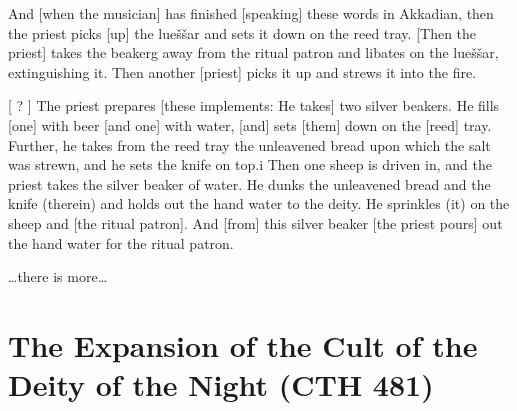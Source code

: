 \documentclass[10pt]{article}
\newcommand{\pr}{\'{ }}									%
\renewcommand{\.}[1]{\textsubdot{#1}}
\begin{document}
\begin{description}
\begin{notes}



\end{notes}

\item[\S\S15{\pr}--16{\pr} (50--57) :] And [when the musician] has finished [speaking] these words in Akkadian, then the priest picks [up] the lue\v{s}\v{s}ar and sets it down on the reed tray. [Then the priest] takes the beakerg away from the ritual patron and libates on the lue\v{s}\v{s}ar, extinguishing it. Then another [priest] picks it up and strews it into the fire.

\begin{notes}



\end{notes}

\item[\S\S17{\pr}--18{\pr} (58--65) :] {[} ? ] The priest prepares [these implements: He takes] two silver beakers. He fills [one] with beer [and one] with water, [and] sets [them] down on the [reed] tray. Further, he takes from the reed tray the unleavened bread upon which the salt was strewn, and he sets the knife on top.i Then one sheep is driven in, and the priest takes the silver beaker of water. He dunks the unleavened bread and the knife (therein) and holds out the hand water to the deity. He sprinkles (it) on the sheep and [the ritual patron]. And [from] this silver beaker [the priest pours] out the hand water for the ritual patron.


\begin{notes}

{\ldots}there is more{\ldots}

\end{notes}

\end{description}

\section{The Expansion of the Cult of the Deity of the Night (CTH 481)}
\end{document}
